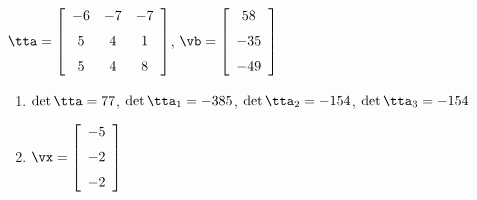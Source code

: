 {$\tta = \left[ \begin {array}{ccc} -6&-7&-7\\\noalign{\medskip}5&4&1
\\\noalign{\medskip}5&4&8\end {array} \right] $,
 \quad
$\vb = \left[ \begin {array}{c} 58\\\noalign{\medskip}-35
\\\noalign{\medskip}-49\end {array} \right] $}
{\begin{enumerate}
\item	$\det{\tta} = 77$, $\det{\tta_1} = -385$, $\det{\tta_2} = -154$, $\det{\tta_3} = -154$
\item $\vx = \left[ \begin {array}{c} -5\\\noalign{\medskip}-2\\\noalign{\medskip}
-2\end {array} \right] $
\end{enumerate}
}
